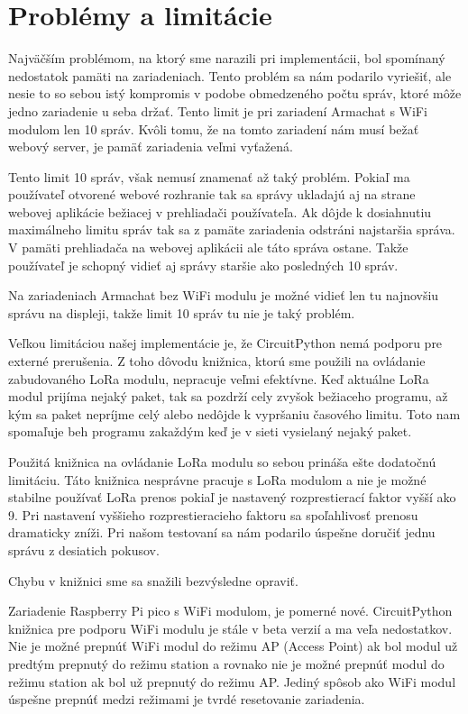 \documentclass[slovak,master]{diploma}
\begin{document}
\section{Problémy a limitácie}
Najväčším problémom, na ktorý sme narazili pri implementácii, bol spomínaný nedostatok pamäti na zariadeniach. Tento problém sa nám podarilo 
vyriešiť, ale nesie to so sebou istý kompromis v podobe obmedzeného počtu správ, ktoré môže jedno zariadenie u seba držať. Tento limit je pri 
zariadení Armachat s WiFi modulom len 10 správ. Kvôli tomu, že na tomto zariadení nám musí bežať webový server, je pamäť zariadenia veľmi vyťažená. 

Tento limit 10 správ, však nemusí znamenať až taký problém. Pokiaľ ma používateľ otvorené webové rozhranie tak sa správy ukladajú aj na strane webovej aplikácie 
bežiacej v prehliadači používateľa. Ak dôjde k dosiahnutiu maximálneho limitu správ tak sa z pamäte zariadenia odstráni najstaršia správa. V pamäti prehliadača na webovej aplikácii 
ale táto správa ostane. Takže používateľ je schopný vidieť aj správy staršie ako posledných 10 správ.

Na zariadeniach Armachat bez WiFi modulu je možné vidieť len tu najnovšiu správu na displeji, takže limit 10 správ tu nie je taký problém.

Veľkou limitáciou našej implementácie je, že CircuitPython nemá podporu pre externé prerušenia. Z toho dôvodu knižnica, ktorú sme použili na ovládanie zabudovaného LoRa modulu, 
nepracuje veľmi efektívne. Keď aktuálne LoRa modul prijíma nejaký paket, tak sa pozdrží cely zvyšok bežiaceho programu, až kým sa paket nepríjme celý alebo nedôjde k vypršaniu 
časového limitu. Toto nam spomaľuje beh programu zakaždým keď je v sieti vysielaný nejaký paket.

Použitá knižnica na ovládanie LoRa modulu so sebou prináša ešte dodatočnú limitáciu. Táto knižnica nesprávne pracuje s LoRa modulom a nie je možné stabilne používať 
LoRa prenos pokiaľ je nastavený rozprestierací faktor vyšší ako 9. Pri nastavení vyššieho rozprestieracieho faktoru sa spoľahlivosť prenosu dramaticky zníži. Pri 
našom testovaní sa nám podarilo úspešne doručiť jednu správu z desiatich pokusov.

Chybu v knižnici sme sa snažili bezvýsledne opraviť.

Zariadenie Raspberry Pi pico s WiFi modulom, je pomerné nové. CircuitPython knižnica pre podporu WiFi modulu je stále v beta verzií a ma veľa nedostatkov.
Nie je možné prepnúť WiFi modul do režimu AP (Access Point) ak bol modul už predtým prepnutý do režimu station a rovnako nie je možné prepnúť modul do režimu station ak bol 
už prepnutý do režimu AP. Jediný spôsob ako WiFi modul úspešne prepnúť medzi režimami je tvrdé resetovanie zariadenia. 
\end{document}
